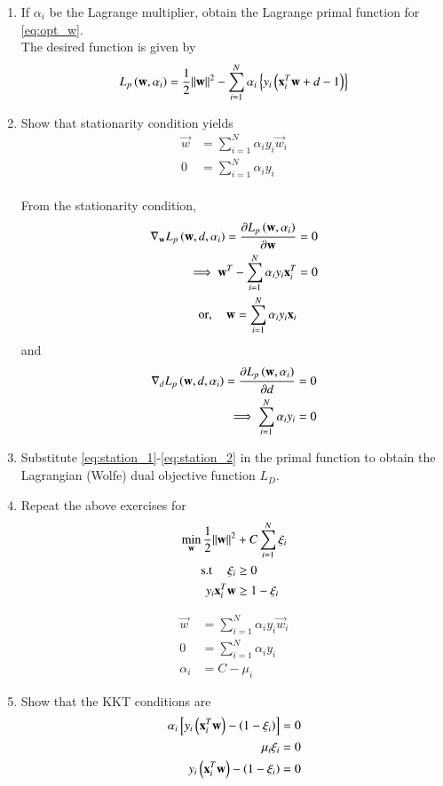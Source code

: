 \documentclass[journal,12pt,twocolumn]{IEEEtran}
\renewcommand\thesection{\arabic{section}}
\begin{document}
\begin{enumerate}[label=\thesection.\arabic*,ref=\thesection.\theenumi]

\item If $\alpha_i$  be the Lagrange multiplier, obtain the Lagrange primal function for \eqref{eq:opt_w}.
\\
\solution The desired function is given by 
\begin{align}
\label{eq:opt_w_primal}
L_p\left(\mathbf{w},\alpha_i\right)= \frac{1}{2}\lVert\mathbf{w}\rVert^2 - 
\sum_{i=1}^{N}\alpha_i\left\{y_i\left(\mathbf{x}_i^T\mathbf{w}+d -1\right)\right\}
\end{align}

\item  Show that stationarity condition yields
%
\begin{align}
\label{eq:station_1}
\vec{w} &= \sum_{i=1}^{N}\alpha_iy_i \vec{w}_i
\\
0 &= \sum_{i=1}^{N}\alpha_iy_i 
\label{eq:station_2}
\end{align}
\\
\solution From the stationarity condition, 
\begin{align}
\nabla_\mathbf{w} L_p\left(\mathbf{w},d,\alpha_i\right)
=\frac{\partial L_p\left(\mathbf{w},\alpha_i\right)}{\partial \mathbf{w}} &= 0
\\
\implies \mathbf{w}^T -  \sum_{i=1}^{N}\alpha_iy_i \mathbf{x}_i^T &= 0
\\
\text{or}, \quad \mathbf{w} =  \sum_{i=1}^{N}\alpha_iy_i \mathbf{x}_i&
\end{align}
and 
\begin{align}
\nabla_d L_p\left(\mathbf{w},d,\alpha_i\right)
=\frac{\partial L_p\left(\mathbf{w},\alpha_i\right)}{\partial d} &= 0
\\
\implies \sum_{i=1}^{N}\alpha_iy_i &= 0
\end{align}


\item Substitute \eqref{eq:station_1}-\eqref{eq:station_2} in the primal function to obtain the Lagrangian 
(Wolfe) dual objective function $L_D$.  
\item Repeat the above exercises for 
\begin{align}
\min_{\mathbf{w}}\frac{1}{2}\lVert\mathbf{w}\rVert^2 &+ C \sum_{i=1}^{N}\xi_i
\\
\text{s.t } \quad \xi_i &\ge 0 
\\ 
y_i\mathbf{x}_i^T\mathbf{w}&\ge1-\xi_i
\end{align}


\begin{align}
\label{eq:station_1}
\vec{w} &= \sum_{i=1}^{N}\alpha_iy_i \vec{w}_i
\\
0 &= \sum_{i=1}^{N}\alpha_iy_i 
\\
\alpha_i &= C - \mu_i
\label{eq:station_2}
\end{align}
\item Show that the KKT conditions are
\begin{align}
\alpha_i {}\left[y_i \left(\mathbf{x}_i^T\mathbf{w}\right)- \left(1-\xi_i\right)\right] &= 0 
\\
\mu_i \xi_i &= 0
\\
y_i \left(\mathbf{x}_i^T\mathbf{w}\right)- \left(1-\xi_i\right) & = 0
\end{align}




\end{enumerate}
\end{document}
